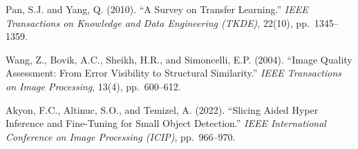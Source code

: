 \documentclass[12pt,a4paper]{article}
\begin{document}
\begin{enumerate}[leftmargin=*, label={[\arabic*]}]
  \item Pan, S.J. and Yang, Q. (2010). ``A Survey on Transfer Learning.'' \textit{IEEE Transactions on Knowledge and Data Engineering (TKDE)}, 22(10), pp.\ 1345--1359.

  \item Wang, Z., Bovik, A.C., Sheikh, H.R., and Simoncelli, E.P. (2004). ``Image Quality Assessment: From Error Visibility to Structural Similarity.'' \textit{IEEE Transactions on Image Processing}, 13(4), pp.\ 600--612.

  \item Akyon, F.C., Altinuc, S.O., and Temizel, A. (2022). ``Slicing Aided Hyper Inference and Fine-Tuning for Small Object Detection.'' \textit{IEEE International Conference on Image Processing (ICIP)}, pp.\ 966--970.

\end{enumerate}
\end{document}
